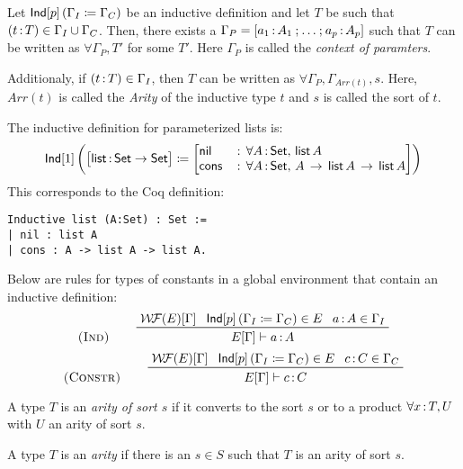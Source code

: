 \documentclass{article}
\begin{document}
\begin{definition}
Let $\mathsf{Ind}[p]\left(\Gamma_I \coloneqq \Gamma_C\right)$ be an inductive definition and let $T$ be such
that $(t {\,:\,} T) \in \Gamma_I \cup \Gamma_C$. Then, there exists a
$\Gamma_P = [a_1 {\,:\,} A_1 \mathbin{;} \ldots \mathbin{;} a_p {\,:\,} A_p]$ such that $T$ can be
written as $\forall \Gamma_P, T'$ for some $T'$. Here $\Gamma_P$ is called the
\emph{context of paramters}.

Additionaly, if $(t {\,:\,} T) \in \Gamma_I$, then $T$ can be written as
$\forall \Gamma_P, \Gamma_{\mathit{Arr}(t)}, s$. Here, $\mathit{Arr}(t)$ is
called the \emph{Arity} of the inductive type $t$ and $s$ is called the sort of
$t$.
\end{definition}

\begin{example}
The inductive definition for parameterized lists is:
\[
\Ind{1}{\begin{bmatrix} \mathsf{list} \cln \Set \rightarrow \Set \end{bmatrix}}
    {\begin{bmatrix*}[l]
        \mathsf{nil}\, &: \,\forall A \cln \Set,\, \mathsf{list}\, A \\
        \mathsf{cons}\, &: \, \forall A \cln \Set,\, A\, \rightarrow\, \mathsf{list}\, A\,
          \rightarrow\, \mathsf{list}\, A
    \end{bmatrix*}}
\]
This corresponds to the Coq definition:
\begin{verbatim}
Inductive list (A:Set) : Set :=
| nil : list A
| cons : A -> list A -> list A.
\end{verbatim}
\end{example}

Below are rules for types of constants in a global environment that contain an
inductive definition:
\[
\prule{Ind}\hspace{5ex}
\prftree
{\wf(E)[\Gamma]}
{\Ind{p}{\Gamma_I}{\Gamma_C} \in E}
{\lasm{a}{A} \in \Gamma_I}
{E[\Gamma] \vdash \lasm{a}{A}}
\]
\[
\prule{Constr}\hspace{5ex}
\prftree
{\wf(E)[\Gamma]}
{\Ind{p}{\Gamma_I}{\Gamma_C} \in E}
{\lasm{c}{C} \in \Gamma_C}
{E[\Gamma] \vdash \lasm{c}{C}}
\]

\begin{definition}
A type $T$ is an \emph{arity of sort $s$} if it converts to the sort $s$ or to a
product $\forall x {\,:\,} T , U$ with $U$ an arity of sort $s$.
\end{definition}
\begin{definition}
A type $T$ is an \emph{arity} if there is an $s \in S$ such that $T$ is an arity
of sort $s$.
\end{definition}
\end{document}
